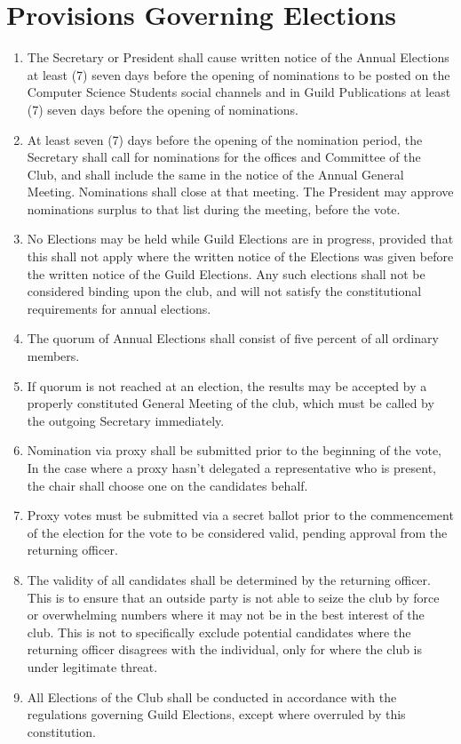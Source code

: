 \documentclass[10pt,a4paper]{report}
\begin{document}
	\section{Provisions Governing Elections}
		\begin{enumerate}[label=\alph*]
			\item The Secretary or President shall cause written notice of the Annual Elections at least (7) seven days before the opening of nominations to be posted on the Computer Science Students social channels and in Guild Publications at least (7) seven days before the opening of nominations.
			\item At least seven (7) days before the opening of the nomination period, the Secretary shall call for nominations for the offices and Committee of the Club, and shall include the same in the notice of the Annual General Meeting. Nominations shall close at that meeting. The President may approve nominations surplus to that list during the meeting, before the vote.
			\item No Elections may be held while Guild Elections are in progress, provided that this shall not apply where the written notice of the Elections was given before the written notice of the Guild Elections. Any such elections shall not be considered binding upon the club, and will not satisfy the constitutional requirements for annual elections.
			\item The quorum of Annual Elections shall consist of five percent of all ordinary members.
			\item If quorum is not reached at an election, the results may be accepted by a properly constituted General Meeting of the club, which must be called by the outgoing Secretary immediately.
			\item Nomination via proxy shall be submitted prior to the beginning of the vote, In the case where a proxy hasn't delegated a representative who is present, the chair shall choose one on the candidates behalf.
			\item Proxy votes must be submitted via a secret ballot prior to the commencement of the election for the vote to be considered valid, pending approval from the returning officer.
			\item The validity of all candidates shall be determined by the returning officer. This is to ensure that an outside party is not able to seize the club by force or overwhelming numbers where it may not be in the best interest of the club. This is not to specifically exclude potential candidates where the returning officer disagrees with the individual, only for where the club is under legitimate threat.
			\item All Elections of the Club shall be conducted in accordance with the regulations governing Guild Elections, except where overruled by this constitution.
		\end{enumerate}
\end{document}
